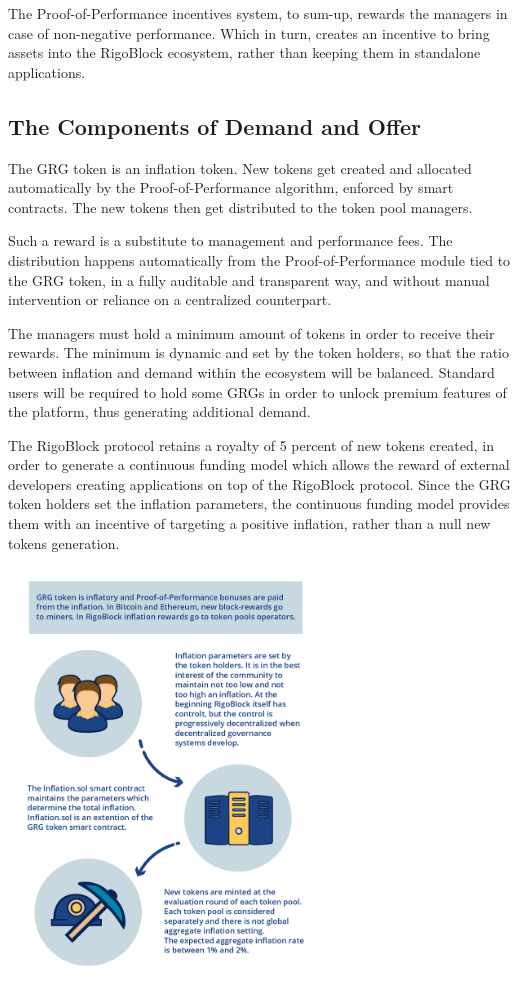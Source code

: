 \documentclass[9pt,oneside]{amsart}
\begin{document}
\begin{multicols}{2}
The Proof-of-Performance incentives system, to sum-up, rewards the managers in case of non-negative performance. Which in turn, creates an incentive to bring assets into the RigoBlock ecosystem, rather than keeping them in standalone applications.

\subsection{The Components of Demand and Offer}
The GRG token is an inflation token. New tokens get created and allocated automatically by the Proof-of-Performance algorithm, enforced by smart contracts. The new tokens then get distributed to the token pool managers. 

Such a reward is a substitute to management and performance fees. The distribution happens automatically from the Proof-of-Performance module tied to the GRG token, in a fully auditable and transparent way, and without manual intervention or reliance on a centralized counterpart. 

The managers must hold a minimum amount of tokens in order to receive their rewards. The minimum is dynamic and set by the token holders, so that the ratio between inflation and demand within the ecosystem will be balanced. Standard users will be required to hold some GRGs in order to unlock premium features of the platform, thus generating additional demand.

The RigoBlock protocol retains a royalty of 5 percent of new tokens created, in order to generate a continuous funding model which allows the reward of external developers creating applications on top of the RigoBlock protocol. Since the GRG token holders set the inflation parameters, the continuous funding model provides them with an incentive of targeting a positive inflation, rather than a null new tokens generation.

\includegraphics[width=8.2cm]{pop-tokenomics3.png}


\end{multicols}
\end{document}
